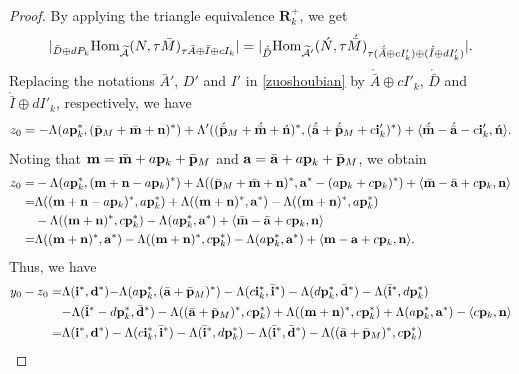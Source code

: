 \documentclass[reqno,12pt]{amsart}
\numberwithin{equation}{section}
\def\lr#1{\langle #1\rangle} \def\fin{\hfill$\square$}  \def\lra{\longrightarrow} \def\mod{\mbox{\rm \textbf{mod}}\,}\def\Mod{\mbox{\rm mod}\,}\def\top{\mbox{\rm top}\,}\def\soc{\mbox{\rm soc}\,}
\theoremstyle{plain} %
\theoremstyle{definition} %
\begin{document}
\begin{proof}
By applying the  triangle equivalence $\mathbf{R}_k^+$, we get
\[|_{\bar{D}\oplus dP_k}\mbox{\rm Hom}_{\widetilde{\mathcal{A}}}(N,\tau \bar{M})_{\tau \bar{A}\oplus \bar{I}\oplus cI_k}|=|_{\acute{\bar{D}}}\mbox{\rm Hom}_{\widetilde{\mathcal{A}'}}(\acute{N},\tau \acute{\bar{M}})_{\tau (\acute{\bar{A}}\oplus cI_k')\oplus ({\acute{\bar{I}}}\oplus dI_k')}|.
\]
Replacing the notations $\bar{A}'$, $D'$ and $I'$ in \eqref{zuoshoubian} by ${\acute{\bar{A}}}\oplus cI'_k$, $\acute{\bar{D}}$ and ${\acute{\bar{I}}}\oplus dI'_k$, respectively,
we have
\[z_0=-\Lambda(a\mathbf{p}_k^\ast,(\bar{\bf p}_M+\bar{\bf m}+{\bf n})^\ast)+\Lambda'((\acute{\bar{\mathbf{p} }}_M+\acute{\bar{\mathbf{m} }}+\acute{\mathbf{n} })^\ast,(\acute{\bar{\mathbf{a} }}+\acute{\bar{\mathbf{p}}}_M+c{\bf i}_k')^\ast)+\lr{\acute{\bar{\mathbf{m} }}-\acute{\bar{\mathbf{a} }}-c{\bf i}_k',\acute{\bf n}}.\]
Noting that ${\bf m}=\bar{\bf m}+a{\bf p}_k+\bar{\bf p}_M$ and ${\bf a}=\bar{\bf a}+a{\bf p}_k+\bar{\bf p}_M$, we obtain
\begin{align*}
	z_0=&-\Lambda(a{\bf p}_k^\ast,({\bf m}+{\bf n}-a{\bf p}_k)^\ast)+\Lambda((\bar{\bf p}_M+\bar{\bf m}+{\bf n})^\ast,{\bf a}^\ast-(a{\bf p}_k+c{\bf p}_k)^\ast)+\lr{\bar{\bf m}-\bar{\bf a}+c{\bf p}_k,{\bf n}}\\
	=&\Lambda(({\bf m}+{\bf n}-a{\bf p}_k)^\ast,a{\bf p}_k^\ast)+\Lambda(({\bf m}+{\bf n})^\ast,{\bf a}^\ast)-\Lambda(({\bf m}+{\bf n})^\ast,a{\bf p}_k^\ast)\\
	&-\Lambda(({\bf m}+{\bf n})^\ast,c{\bf p}_k^\ast)-\Lambda(a{\bf p}_k^\ast, {\bf a}^\ast)+\lr{\bar{\bf m}-\bar{\bf a}+c{\bf p}_k,{\bf n}}\\
	=&\Lambda(({\bf m}+{\bf n})^\ast,{\bf a}^\ast)-\Lambda(({\bf m}+{\bf n})^\ast,c{\bf p}_k^\ast)-\Lambda(a{\bf p}_k^\ast, {\bf a}^\ast)+\lr{{\bf m}-{\bf a}+c{\bf p}_k,{\bf n}}.
\end{align*}
Thus, we have
\begin{align*}
	y_0-z_0=&\Lambda({\bf i}^\ast,{\bf d}^\ast){-\Lambda(a{\bf p}_k^\ast,(\bar{\bf a}+\bar{\bf p}_M)^\ast)}-\Lambda(c{\bf i}_k^\ast,\bar{\bf i}^\ast)-{\Lambda(d{\bf p}_k^\ast, \bar{\bf d}^\ast)}-\Lambda({\bar{\mathbf{i} }}^\ast,d{\bf p}_k^\ast)\\
	&{-\Lambda({\bar{\mathbf{i}}}^\ast-d{\bf p}_k^\ast,{\bar{\bf d}^\ast})}-\Lambda((\bar{\mathbf{a}}+\bar{\mathbf{p}}_M)^\ast,c{\mathbf{p}_k^\ast})+\Lambda(({\bf m}+{\bf n})^\ast,c{\bf p}_k^\ast)+{\Lambda(a{\bf p}_k^\ast, {\bf a}^\ast)}-\lr{c{\bf p}_k,{\bf n}}\\
	=&\Lambda({\bf i}^\ast,{\bf d}^\ast)-\Lambda(c{\bf i}_k^\ast,\bar{\bf i}^\ast)-\Lambda({\bar{\mathbf{i} }}^\ast,d{\bf p}_k^\ast)-\Lambda({\bar{\mathbf{i}}}^\ast,{\bar{\bf d}^\ast})-\Lambda((\bar{\mathbf{a}}+\bar{\mathbf{p}}_M)^\ast,c{\mathbf{p}_k^\ast})\\

\end{align*}
\end{proof}
\end{document}
